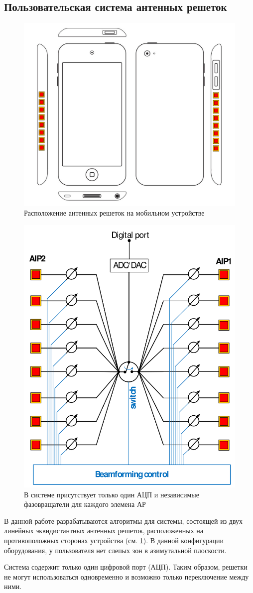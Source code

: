 \subsection{Пользовательская система антенных решеток}
\begin{figure}[ht]
    \centering
    \includegraphics[width=0.5\linewidth]{figs/fig4.3}
    \caption{Расположение антенных решеток на мобильном устройстве}
    \label{fig:4.3}
\end{figure}

\begin{figure}[ht]
    \centering
    \includegraphics[width=0.4\linewidth]{figs/fig4.4}
    \caption{В системе присутствует только один АЦП и независимые фазовращатели для каждого элемена АР}
    \label{fig:4.4}
\end{figure}

В данной работе разрабатываются алгоритмы для системы, состоящей из двух линейных эквидистантных антенных решеток, расположенных на противоположных сторонах
устройства (см. \ref{fig:4.3}). В данной конфигурации оборудования, у пользователя нет слепых зон в азимутальной плоскости.

Система содержит только один цифровой порт (АЦП). Таким образом, решетки не могут
использоваться одновременно и возможно только переключение между ними.

